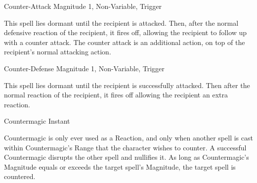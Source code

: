 \begin{rpg-spell}
{Counter-Attack}
{Magnitude 1, Non-Variable, Trigger}

This spell lies dormant until the recipient is attacked. Then, after the normal defensive reaction of the recipient, it fires off, allowing the recipient to follow up with a counter attack. The counter attack is an additional action, on top of the recipient’s normal attacking action.
\end{rpg-spell}


\begin{rpg-spell}
{Counter-Defense}
{Magnitude 1, Non-Variable, Trigger}

This spell lies dormant until the recipient is successfully attacked. Then after the normal reaction of the recipient, it fires off allowing the recipient an extra reaction.
\end{rpg-spell}



\begin{rpg-spell}
{Countermagic}
{Instant}

Countermagic is only ever used as a Reaction, and only when another spell is cast within Countermagic’s Range that the character wishes to counter. A successful Countermagic disrupts the other spell and nullifies it. As long as Countermagic’s Magnitude equals or exceeds the target spell’s Magnitude, the target spell is countered.
\end{rpg-spell}


%


